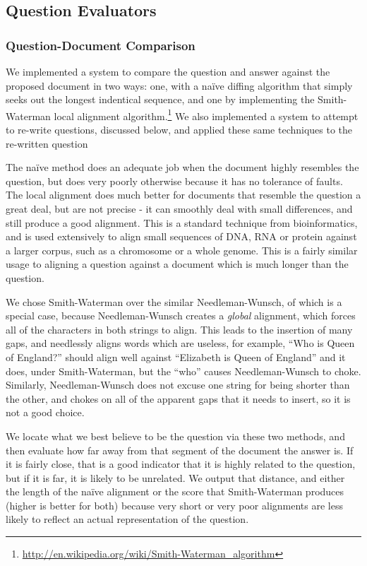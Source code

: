 \documentclass{article}
\begin{document}
\subsection{Question Evaluators}

\subsubsection{Question-Document Comparison}

	We implemented a system to compare the question and answer against the
	proposed document in two ways:  one, with a na\"ive diffing algorithm that
	simply seeks out the longest indentical sequence, and one by implementing
	the Smith-Waterman local alignment
	algorithm.\footnote{\url{http://en.wikipedia.org/wiki/Smith-Waterman_algorithm}}
	We also implemented a system to attempt to re-write questions, discussed
	below, and applied these same techniques to the re-written question

	The na\"ive method does an adequate job when the document highly resembles
	the question, but does very poorly otherwise because it has no tolerance of
	faults.  The local alignment does much better for documents that resemble
	the question a great deal, but are not precise - it can smoothly deal with
	small differences, and still produce a good alignment.  This is a standard
	technique from bioinformatics, and is used extensively to align small
	sequences of DNA, RNA or protein against a larger corpus, such as a
	chromosome or a whole genome.  This is a fairly similar usage to aligning a
	question against a document which is much longer than the question.

	We chose Smith-Waterman over the similar Needleman-Wunsch, of which is a
	special case, because Needleman-Wunsch creates a \emph{global} alignment,
	which forces all of the characters in both strings to align.  This leads to
	the insertion of many gaps, and needlessly aligns words which are useless,
	for example, ``Who is Queen of England?'' should align well against
	``Elizabeth is Queen of England'' and it does, under Smith-Waterman, but the
	``who'' causes Needleman-Wunsch to choke.  Similarly, Needleman-Wunsch does
	not excuse one string for being shorter than the other, and chokes on all of
	the apparent gaps that it needs to insert, so it is not a good choice.

	We locate what we best believe to be the question via these two methods, and
	then evaluate how far away from that segment of the document the answer is.
	If it is fairly close, that is a good indicator that it is highly related to
	the question, but if it is far, it is likely to be unrelated.  We output
	that distance, and either the length of the na\"ive alignment or the score
	that Smith-Waterman produces (higher is better for both) because very short
	or very poor alignments are less likely to reflect an actual representation
	of the question.
\end{document}
